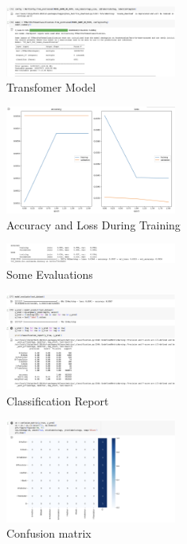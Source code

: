 \documentclass{solutionclass} %
\begin{document}
\begin{figure}[h!]
    \caption{Transfomer Model}
    \centering
    \includegraphics[width=0.5\textwidth]{img/2/4.png}
\end{figure}

\begin{figure}[h!]
    \caption{ Accuracy and Loss During Training}
    \centering
    \includegraphics[width=0.5\textwidth]{img/2/5.png}
\end{figure}

\begin{figure}[h!]
    \caption{Some Evaluations}
    \centering
    \includegraphics[width=0.5\textwidth]{img/2/6.png}
\end{figure}

\begin{figure}[h!]
    \caption{Classification Report}
    \centering
    \includegraphics[width=0.5\textwidth]{img/2/7.png}
\end{figure}
\newpage
\begin{figure}[h!]
    \caption{Confusion matrix}
    \centering
    \includegraphics[width=0.5\textwidth]{img/2/8.png}
\end{figure}
\end{document}
